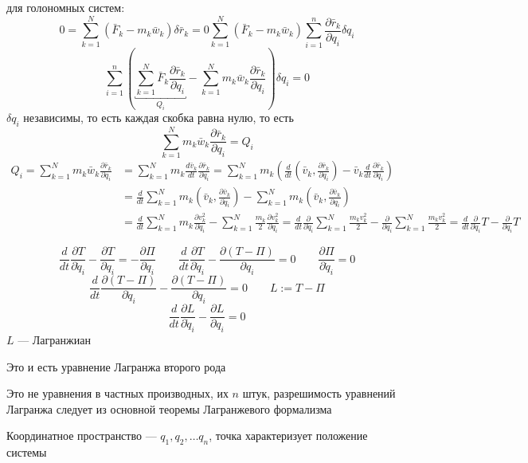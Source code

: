 \documentclass[crop=false]{standalone}
\begin{document}
для голономных систем:
\[0 = \sum_{k=1}^{N} (\bar F_k - m_k \bar w_k) \delta \bar r_k = 0 \sum_{k=1}^{N} (\bar F_k - m_k \bar w_k) \sum_{i=1}^{n} \frac{\partial \bar r_k}{\partial q_i} \delta q_i \]
\[\sum_{i=1}^{n} \left( \underbracket{\sum_{k=1}^{N} \bar F_k \frac{\partial \bar r_k}{\partial q_i}}_{Q_i} -  \sum_{k=1}^{N} m_k \bar w_k \frac{\partial \bar r_k}{\partial q_i} \right) \delta q_i = 0\]
$\delta q_i$ независимы, то есть каждая скобка равна нулю, то есть
\[\sum_{k=1}^N m_k \bar w_k \frac{\partial \bar r_k}{\partial q_i} = Q_i\]
\[
\begin{aligned}
Q_i = \sum_{k=1}^N m_k \bar w_k \frac{\partial \bar r_k}{\partial q_i} &= \sum_{k=1}^{N} m_k \frac{d \bar v_k}{d t} \frac{\partial \bar r_k}{\partial q_i} = \sum_{k=1}^{N} m_k  \left( \frac{d}{d t} \left(\bar v_k, \frac{\partial \bar r_k}{\partial q_i}\right) - \bar v_k \frac{d}{d t} \frac{\partial \bar r_k}{\partial q_i} \right) \\
&= \frac{d}{d t} \sum_{k=1}^{N} m_k \left( \bar v_k , \frac{\partial \bar v_k}{\partial \dot q_i}\right) - \sum_{k=1}^{N} m_k \left(\bar v_k, \frac{\partial \bar v_k}{\partial q_i} \right) \\
&= \frac{d}{d t} \sum_{k=1}^{N} m_k \frac{\partial v_k^2}{\partial \dot q_i} - \sum_{k=1}^{N} \frac{m_k}{2} \frac{\partial v_k^2}{\partial q_i} = \frac{d}{d t} \frac{\partial}{\partial \dot q_i}\sum_{k=1}^{N} \frac{m_k v_k^2}{2} - \frac{\partial}{\partial q_i} \sum_{k=1}^{N} \frac{m_k v_k^2}{2} = \frac{d}{d t} \frac{\partial}{\partial \dot q_i} T - \frac{\partial}{\partial q_i} T
\end{aligned}
\]

\[\frac{d}{d t} \frac{\partial T}{\partial \dot q_i} - \frac{\partial T}{\partial q_i} = - \frac{\partial \Pi}{\partial q_i} \qquad \frac{d}{d t} \frac{\partial T}{\partial \dot q_i} - \frac{\partial (T - \Pi)}{\partial q_i} =0 \qquad \frac{\partial \Pi}{\partial \dot q_i} = 0\]
\[\frac{d}{d t} \frac{\partial(T -\Pi)}{\partial \dot q_i} - \frac{\partial (T - \Pi)}{\partial q_i} =0 \qquad L := T - \Pi\]
\[\boxed{\frac{d}{d t} \frac{\partial L}{\partial \dot q_i} - \frac{\partial L}{\partial q_i} =0}\]
\Def $L$ — Лагранжиан

Это и есть уравнение Лагранжа второго рода

Это не уравнения в частных производных, их $n$ штук, разрешимость уравнений Лагранжа следует из основной теоремы Лагранжевого формализма

\Def Координатное пространство — $q_1, q_2, \dots q_n$, точка характеризует положение системы
\end{document}
